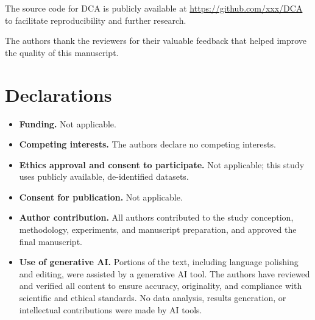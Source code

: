 \documentclass[pdflatex,sn-nature]{sn-jnl}%
\theoremstyle{thmstyleone}%
\theoremstyle{thmstyletwo}%
\theoremstyle{thmstylethree}%
\begin{document}
The source code for DCA is publicly available at \url{https://github.com/xxx/DCA} to facilitate reproducibility and further research.

The authors thank the reviewers for their valuable feedback that helped improve the quality of this manuscript.

\section*{Declarations}

\begin{itemize}
\item \textbf{Funding.} Not applicable.
\item \textbf{Competing interests.} The authors declare no competing interests.
\item \textbf{Ethics approval and consent to participate.} Not applicable; this study uses publicly available, de-identified datasets.
\item \textbf{Consent for publication.} Not applicable.
\item \textbf{Author contribution.} All authors contributed to the study conception, methodology, experiments, and manuscript preparation, and approved the final manuscript.
\item \textbf{Use of generative AI.} Portions of the text, including language polishing and editing, were assisted by a generative AI tool. The authors have reviewed and verified all content to ensure accuracy, originality, and compliance with scientific and ethical standards. No data analysis, results generation, or intellectual contributions were made by AI tools.
\end{itemize}


\end{document}
